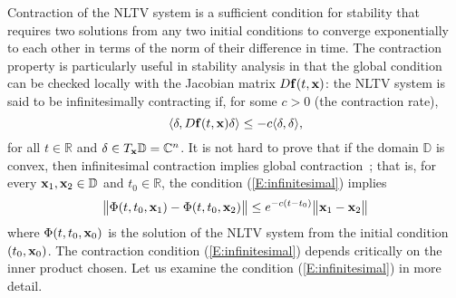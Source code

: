 
Contraction of the NLTV system is a sufficient condition for stability that requires two solutions from any two initial conditions to converge exponentially to each other in terms of the norm of their difference in time. The contraction property is particularly useful in stability analysis in that the global condition can be checked locally with the Jacobian matrix $D \mathbf{f}(t, \mathbf{x})$: the NLTV system is said to be infinitesimally contracting if, for some $c > 0$ (the contraction rate),
\begin{equation} \label{E:infinitesimal}
     \langle \delta, D \mathbf{f}(t, \mathbf{x}) \delta \rangle \leq -c \langle \delta, \delta \rangle,
\end{equation}
for all $t \in \mathbb{R}$ and $\delta \in T_{\mathbf{x}} \mathbb{D} = \mathbb{C}^n$.
It is not hard to prove that if the domain $\mathbb{D}$ is convex, then infinitesimal contraction implies global contraction~\cite{sontag2010contractive,simpson2014contraction}; that is, for every $\mathbf{x}_1, \mathbf{x}_2 \in \mathbb{D}$ and $t_0 \in \mathbb{R}$, the condition (\ref{E:infinitesimal}) implies
\begin{equation} \label{E:distance_contraction}
    \big\|\Phi(t, t_0, \mathbf{x}_1) - \Phi(t, t_0, \mathbf{x}_2)\big\| \leq e^{-c (t - t_0)} \big\|\mathbf{x}_1 - \mathbf{x}_2\big\|
\end{equation}
where $\Phi(t, t_0, \mathbf{x}_0)$ is the solution of the NLTV system from the initial condition $(t_0, \mathbf{x}_0)$. The contraction condition (\ref{E:infinitesimal}) depends critically on the inner product chosen. Let us examine the condition (\ref{E:infinitesimal}) in more detail.

